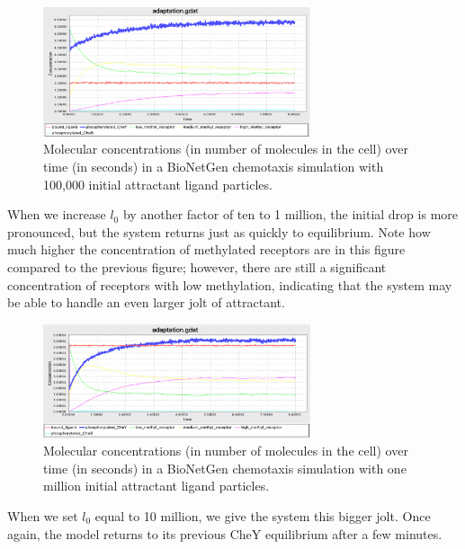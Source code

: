\begin{figure}[h]
\centering
\mySfFamily
\includegraphics[width = 0.7\textwidth]{../images/chemotaxis_tutorial_oneadd1e5.png}
\caption{Molecular concentrations (in number of molecules in the cell) over time (in seconds) in a BioNetGen chemotaxis simulation with 100,000 initial attractant ligand particles.}
\label{fig:chemotaxis_tutorial_oneadd1e5}
\end{figure}


When we increase $l_0$ by another factor of ten to 1 million, the initial drop is more pronounced, but the system returns just as quickly to equilibrium. Note how much higher the concentration of methylated receptors are in this figure compared to the previous figure; however, there are still a significant concentration of receptors with low methylation, indicating that the system may be able to handle an even larger jolt of attractant.

\begin{figure}[h]
\centering
\mySfFamily
\includegraphics[width = 0.7\textwidth]{../images/chemotaxis_tutorial_oneadd1e6.png}
\caption{Molecular concentrations (in number of molecules in the cell) over time (in seconds) in a BioNetGen chemotaxis simulation with one million initial attractant ligand particles.}
\label{fig:chemotaxis_tutorial_oneadd16}
\end{figure}

When we set $l_0$ equal to 10 million, we give the system this bigger jolt. Once again, the model returns to its previous CheY equilibrium after a few minutes.

